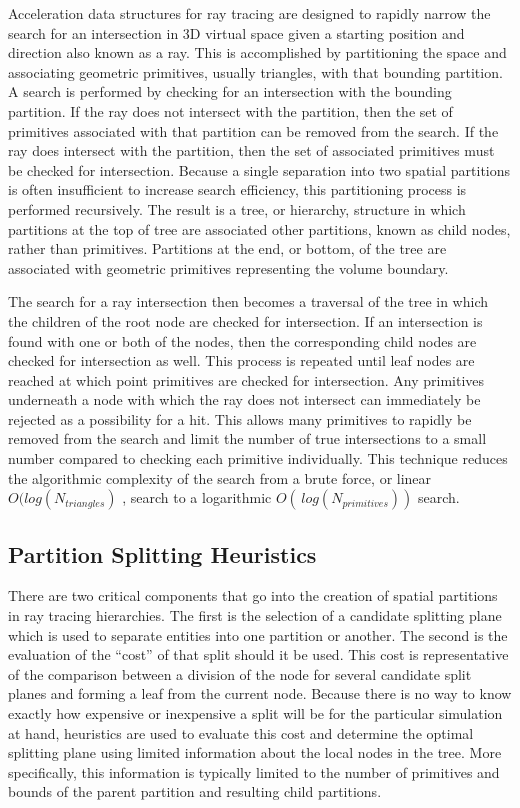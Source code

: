 Acceleration data structures for ray tracing are designed to rapidly narrow the
search for an intersection in 3D virtual space given a starting position and
direction also known as a ray. This is accomplished by partitioning the space
and associating geometric primitives, usually triangles, with that bounding
partition. A search is performed by checking for an intersection with the
bounding partition. If the ray does not intersect with the partition, then the
set of primitives associated with that partition can be removed from the
search. If the ray does intersect with the partition, then the set of associated
primitives must be checked for intersection. Because a single separation into
two spatial partitions is often insufficient to increase search efficiency, this
partitioning process is performed recursively. The result is a tree, or
hierarchy, structure in which partitions at the top of tree are associated other
partitions, known as child nodes, rather than primitives. Partitions at the end,
or bottom, of the tree are associated with geometric primitives representing the
volume boundary.

The search for a ray intersection then becomes a traversal of the tree in which
the children of the root node are checked for intersection. If an intersection
is found with one or both of the nodes, then the corresponding child nodes are
checked for intersection as well. This process is repeated until leaf nodes are
reached at which point primitives are checked for intersection. Any primitives
underneath a node with which the ray does not intersect can immediately be
rejected as a possibility for a hit. This allows many primitives to rapidly be
removed from the search and limit the number of true intersections to a small
number compared to checking each primitive individually. This technique reduces
the algorithmic complexity of the search from a brute force, or linear
$O(log(N_{triangles})$ , search to a logarithmic $O(\, log(N_{primitives}))$
search.

\subsection{Partition Splitting Heuristics}

There are two critical components that go into the creation of spatial
partitions in ray tracing hierarchies. The first is the selection of a candidate
splitting plane which is used to separate entities into one partition or
another. The second is the evaluation of the ``cost'' of that split should it be
used. This cost is representative of the comparison between a division of the
node for several candidate split planes and forming a leaf from the current
node.  Because there is no way to know exactly how expensive or inexpensive a
split will be for the particular simulation at hand, heuristics are used to
evaluate this cost and determine the optimal splitting plane using limited
information about the local nodes in the tree. More specifically, this
information is typically limited to the number of primitives and bounds of the
parent partition and resulting child partitions.

